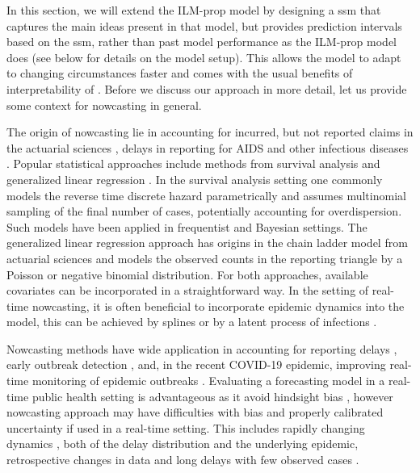 In this section, we will extend the ILM-prop model by designing a \acrshort{ssm} that captures the main ideas present in that model, but provides prediction intervals based on the \acrshort{ssm}, rather than past model performance as the ILM-prop model does (see below for details on the model setup). This allows the model to adapt to changing circumstances faster and comes with the usual benefits of interpretability of . Before we discuss our approach in more detail, let us provide some context for nowcasting in general.

The origin of nowcasting lie in accounting for incurred, but not reported claims in the actuarial sciences \citep{Kaminsky1987Prediction}, delays in reporting for AIDS \citep{Zeger1989Statistical,Lawless1994Adjustments} and other infectious diseases \citep{Farrington1996Statistical}. Popular statistical approaches include methods from survival analysis \citep{Lawless1994Adjustments} and generalized linear regression \citep{Zeger1989Statistical}. In the survival analysis setting one commonly models the reverse time discrete hazard parametrically and assumes multinomial sampling of the final number of cases, potentially accounting for overdispersion. Such models have been applied in frequentist \citep{Midthune2005Modeling} and Bayesian \citep{Hohle2014Bayesian,AnDerHeiden2020Schatzung} settings. The generalized linear regression approach has origins in the chain ladder model from actuarial sciences \citep{Renshaw1998Stochastic} and models the observed counts in the reporting triangle by a Poisson or negative binomial distribution.
For both approaches, available covariates can be incorporated in a straightforward way. In the setting of real-time nowcasting, it is often beneficial to incorporate epidemic dynamics into the model, this can be achieved by splines \citep{Hohle2014Bayesian,vandeKassteele2019Nowcasting} or by a latent process of infections \citep{McGough2020Nowcasting}.

Nowcasting methods have wide application in accounting for reporting delays \citep{Midthune2005Modeling}, early outbreak detection \citep{Salmon2015Bayesian,Bastos2019Modelling}, and, in the recent COVID-19 epidemic, improving real-time monitoring of epidemic outbreaks \citep{AnDerHeiden2020Schatzung,Gunther2021Nowcasting,Schneble2021Nowcasting,Akhmetzhanov2021Estimation}. Evaluating a forecasting model in a real-time public health setting is advantageous as it avoid hindsight bias \citep{Desai2019Realtime}, however nowcasting approach may have difficulties with bias and properly calibrated uncertainty if used in a real-time setting. This includes rapidly changing dynamics \citep{Gunther2021Nowcasting,vandeKassteele2019Nowcasting}, both of the delay distribution and the underlying epidemic, retrospective changes in data \citep{Midthune2005Modeling} and long delays with few observed cases \citep{Noufaily2015Modelling}. 

